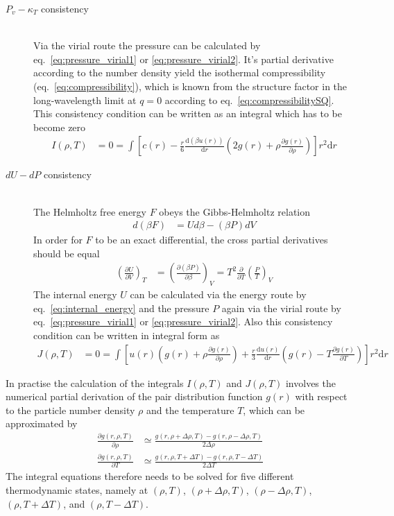 \begin{description}
\item[$P_v-\kappa_T$ consistency] \vphantom{.}~\\
Via the virial route the pressure can be calculated by eq.\
\ref{eq:pressure_virial1} or \ref{eq:pressure_virial2}. It's partial
derivative according to the number density yield the isothermal
compressibility (eq.\ \ref{eq:compressibility}), which is known from the structure factor
in the long-wavelength limit at $q=0$ according to eq.\  \ref{eq:compressibilitySQ}.
This consistency condition can be written as an integral which has to be become zero \cite{Martynov1993,Vompe1994}
\begin{align}
I(\rho,T)&=0=\int\left[c(r)-\frac{r}{6}\frac{\mathrm{d}\left(\beta u(r)\right)}{\mathrm{d}r}\left(2g(r)+\rho\frac{\partial g(r)}{\partial\rho}\right)\right] r^2 \mathrm{d}r
\end{align}
\item[$dU-dP$ consistency]  \vphantom{.}~\\
The Helmholtz free energy $F$ obeys the Gibbs-Helmholtz relation
\begin{align}
d(\beta F) &= U d\beta - (\beta P) dV
\end{align}
In order for $F$ to be an exact differential, the cross partial
derivatives should be equal
\begin{align}
\left(\frac{\partial U}{\partial V}\right)_T &= \left( \frac{\partial (\beta P)}{\partial \beta} \right)_V = T^2 \frac{\partial}{\partial T} \left( \frac{P}{T} \right)_V
\end{align}
The internal energy $U$ can be calculated via the energy route by eq.\
\ref{eq:internal_energy} and the pressure $P$ again via the virial route by
eq.\ \ref{eq:pressure_virial1} or \ref{eq:pressure_virial2}.
Also this consistency condition can be written in integral form as
\begin{align}
J(\rho,T)&=0=\int\left[u(r)\left(g(r)+\rho\frac{\partial g(r)}{\partial \rho}\right)+\frac{r}{3}\frac{\mathrm{d} u(r)}{\mathrm{d}r}\left(g(r)-T\frac{\partial g(r)}{\partial T}\right)\right] r^2 \mathrm{d}r
\end{align}
\end{description}
In practise  the calculation of the integrals $I(\rho,T)$ and $J(\rho,T)$ involves the numerical partial derivation of the
pair distribution function $g(r)$ with respect to the particle number density $\rho$ and the temperature $T$, which can
be approximated by
\begin{align}
\frac{\partial g(r,\rho,T)}{\partial \rho} &\simeq \frac{g(r,\rho+\Delta\rho,T)-g(r,\rho-\Delta\rho,T)}{2\Delta\rho} \\
\frac{\partial g(r,\rho,T)}{\partial T}    &\simeq \frac{g(r,\rho,T+\Delta T)-g(r,\rho,T-\Delta T)}{2\Delta T}
\end{align}
The integral equations therefore needs to be solved for five different thermodynamic states, namely at $(\rho,T)$,
$(\rho+\Delta\rho,T)$, $(\rho-\Delta\rho,T)$, $(\rho,T+\Delta T)$, and $(\rho,T-\Delta T)$.

